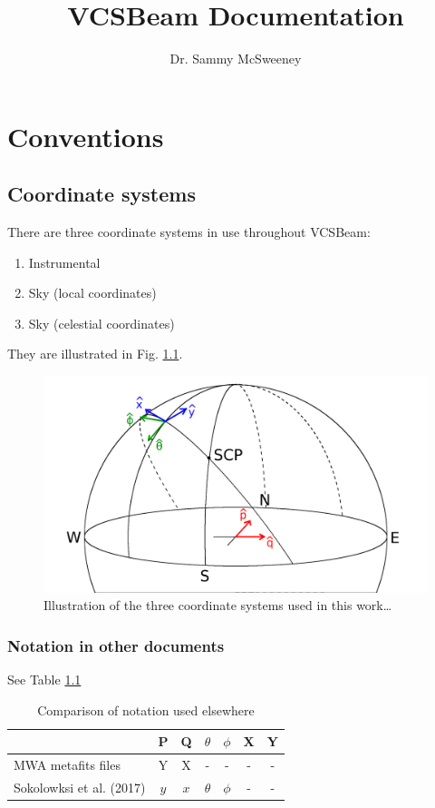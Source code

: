 \documentclass{book}
\title{VCSBeam Documentation}
\author{Dr. Sammy McSweeney}
\begin{document}
\maketitle

\tableofcontents

\chapter{Conventions}

\section{Coordinate systems}

There are three coordinate systems in use throughout VCSBeam:
\begin{enumerate}
    \item Instrumental
    \item Sky (local coordinates)
    \item Sky (celestial coordinates)
\end{enumerate}
They are illustrated in Fig. \ref{fig:coords}.
\begin{figure}[!bh]
    \centering
    \includegraphics[width=\textwidth]{coords.png}
    \caption{Illustration of the three coordinate systems used in this work\dots}
    \label{fig:coords}
\end{figure}

\subsection{Notation in other documents}

See Table \ref{tbl:notations}
\begin{table}[!hb]
    \centering
    \caption{Comparison of notation used elsewhere}
    \label{tbl:notations}
    \begin{tabular}{l|cc|cc|cc}
        & P & Q & $\theta$ & $\phi$ & X & Y \\
        \hline
        MWA metafits files       & Y & X & - & - & - & - \\
        Sokolowksi et al. (2017) & $y$ & $x$ & $\theta$ & $\phi$ & - & - \\
    \end{tabular}
\end{table}
\end{document}
